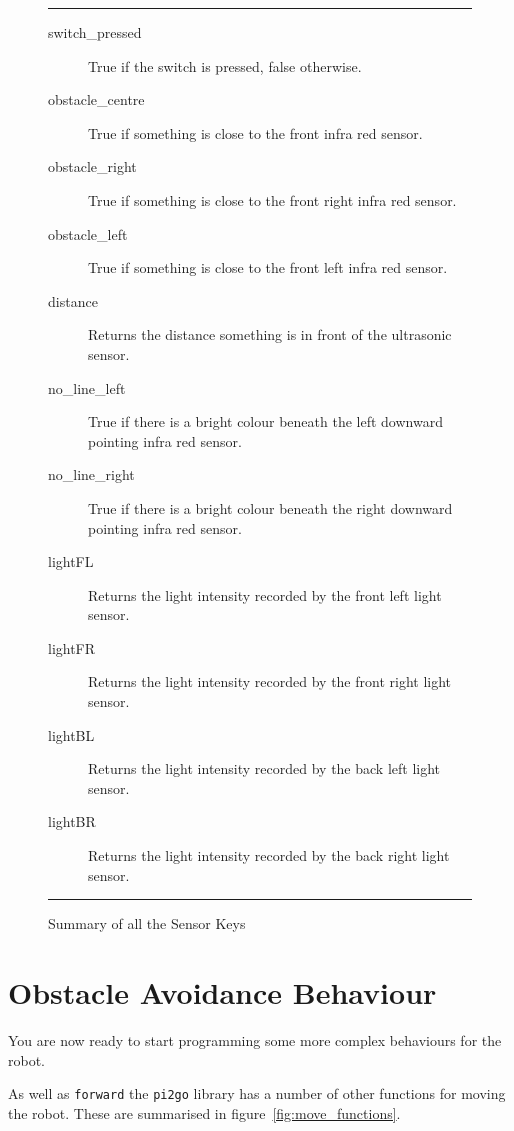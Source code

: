 \documentclass[a4,12pt]{article}
\begin{document}
\begin{figure}[htbp]
  \hrule
  \begin{description}
  \item[switch\_pressed] True if the switch is pressed, false otherwise.
  \item[obstacle\_centre] True if something is close to the front infra red sensor.
  \item[obstacle\_right] True if something is close to the front right infra red sensor.
  \item[obstacle\_left] True if something is close to the front left infra red sensor.
  \item[distance] Returns the distance something is in front of the ultrasonic sensor.
    \item[no\_line\_left] True if there is a bright colour beneath the left downward pointing infra red sensor.
    \item[no\_line\_right] True if there is a bright colour beneath the right downward pointing infra red sensor.
      \item[lightFL] Returns the light intensity recorded by the front left light sensor.
      \item[lightFR] Returns the light intensity recorded by the front right light sensor.
      \item[lightBL] Returns the light intensity recorded by the back left light sensor.
      \item[lightBR] Returns the light intensity recorded by the back right light sensor.
  \end{description}
  \hrule
  \caption{Summary of all the Sensor Keys}
  \label{fig:sensor_keys}
\end{figure}


\section{Obstacle Avoidance Behaviour}

You are now ready to start programming some more complex behaviours for the robot.

As well as \lstinline{forward} the \lstinline{pi2go} library has a number of other functions for moving the robot.  These are summarised in figure~\ref{fig:move_functions}.
\end{document}
